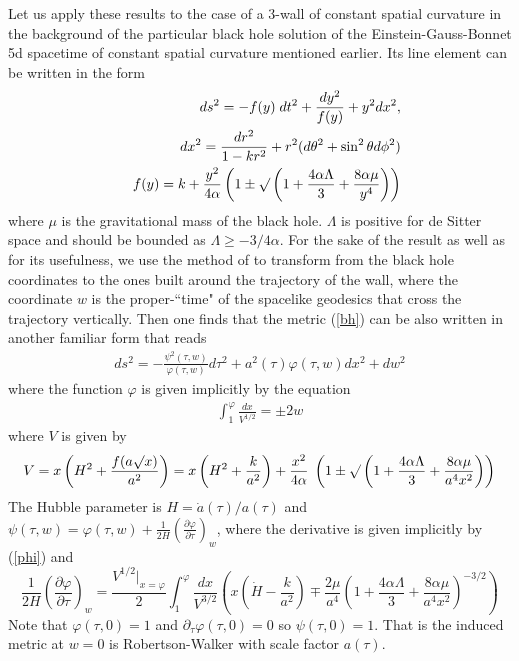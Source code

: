 \documentclass[a4paper,a4paper]{article}
\begin{document}
Let us apply these results to the case of a 3-wall of constant spatial curvature in
the background of the particular black hole solution of the Einstein-Gauss-Bonnet 5d spacetime
of constant spatial curvature
mentioned earlier. 
Its line element can be written in the form
\begin{eqnarray} \label{bh}
&&ds^2=-f(y) \; dt^2+ \frac{dy^2}{f(y)}+y^2 dx^2, \\ \nonumber
&&dx^2=\frac{dr^2}{1-kr^2}+r^2(d\theta^2+\sin^2\theta d\phi^2) \\ \nonumber
&&f(y)=k+\frac{ y^2}{4\alpha} \left( 1 \pm \surd \left(  1+  
\frac{4\alpha \Lambda}{3}+\frac{8 \alpha \mu}{ y^4} \right) \right)  
\end{eqnarray}
where $\mu$ is the gravitational mass of the black hole.
$\Lambda$ is positive for de Sitter
space and should be bounded as $\Lambda \geq - 3/4 \alpha$.
For the sake of the result as well as for its usefulness,  
we use the method of \cite{Mukohyama:1999wi} to transform from the black hole coordinates to
the ones built around the trajectory of the wall, where the coordinate $w$ is the proper-``time" of the
spacelike geodesics that cross the trajectory vertically.
Then one finds that the metric (\ref{bh}) can be also written
in another familiar form that reads
\begin{eqnarray} \label{wall}
ds^2=-\frac{\psi^2(\tau,w)}{ \varphi (\tau ,w)} d\tau^2+ a^2(\tau) \varphi (\tau,w) dx^2+dw^2
\end{eqnarray} 
where the function $\varphi$ is given implicitly by the equation
\begin{eqnarray} \label{phi}
\int^{\varphi}_1 \frac{dx}{V^{1/2}}= \pm 2w
\end{eqnarray}
where $V$ is given by
\begin{eqnarray}
V=x\left(H^2+ \frac{f(a\surd x)}{a^2} \right)=x \left( H^2+ \frac{k}{a^2} \right)+ \frac{x^2}{4 \alpha} \;
\left( 1 \pm \surd \left(1+\frac{4 \alpha \Lambda}{3} +\frac{8 \alpha \mu}{ a^4 x^2} \right) \right) 
\end{eqnarray}
The Hubble parameter is $H=\dot a(\tau) / a(\tau)$ and
$\psi(\tau,w)=\varphi(\tau,w)+\frac{1}{2H} ( \frac{\partial \varphi}{\partial \tau} )_w$,
where the derivative is given implicitly by (\ref{phi}) and
\begin{equation}
\frac{1}{2H} ( \frac{\partial \varphi}{\partial \tau})_w = \frac{ V^{1/2}|_{x=\varphi } }{2}
\int^{\varphi}_1   \frac{dx}{V^{3/2}}   \left( x \left( \dot H-\frac{k}{a^2} \right) 
\mp \frac{2\mu}{a^4}  \left(  1+\frac{4\alpha \Lambda}{3} +\frac{8 \alpha \mu}{ a^4 x^2} \right)^{-3/2} \right)
\end{equation}
Note that $\varphi (\tau,0)=1$ and $ \partial_{\tau} \varphi (\tau,0)=0$ so $\psi(\tau,0)=1$. That is
the induced metric at $w=0$ is Robertson-Walker with scale factor $a(\tau)$.
\end{document}
